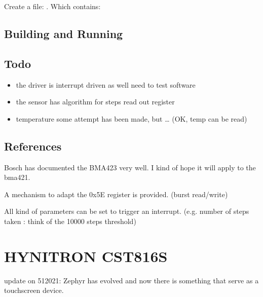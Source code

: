 \documentclass[letterpaper,10pt,english]{sphinxmanual}
\begin{document}
Create a file: .
Which contains:

\begin{sphinxVerbatim}[commandchars=\\\{\}]
 
 
        
        
\end{sphinxVerbatim}


\subsection{Building and Running}
\label{\detokenize{drivers/bma421:building-and-running}}

\subsection{Todo}
\label{\detokenize{drivers/bma421:todo}}\begin{itemize}
\item {} 
the driver is interrupt driven as well \textendash{} need to test software

\item {} 
the sensor has algorithm for steps \textendash{} read out register

\item {} 
temperature some attempt has been made, but … (OK, temp can be read)

\end{itemize}


\subsection{References}
\label{\detokenize{drivers/bma421:references}}
Bosch has documented the BMA423 very well.
I kind of hope it will apply to the bma421.

A mechanism to adapt the 0x5E register is provided.
(burst read/write)

All kind of parameters can be set to trigger an interrupt.
(e.g. number of steps taken : think of the 10000 steps threshold)


\section{HYNITRON CST816S}
\label{\detokenize{drivers/cst816s:hynitron-cst816s}}\label{\detokenize{drivers/cst816s::doc}}
update on 5\sphinxhyphen{}1\sphinxhyphen{}2021:
Zephyr has evolved and now there is something that serve as a touchscreen device.
\end{document}

